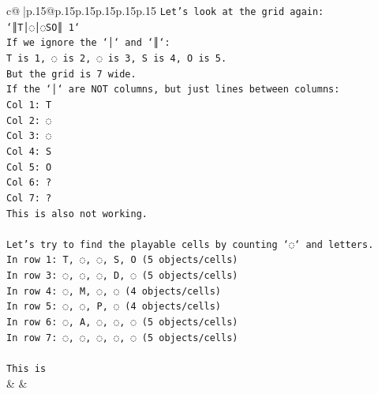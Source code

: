 \documentclass{article}
\begin{document}
{\begin{supertabular}{c@{$\;$}|p{.15\linewidth}@{}p{.15\linewidth}p{.15\linewidth}p{.15\linewidth}p{.15\linewidth}p{.15\linewidth}}
{{{\texttt{Let's look at the grid again:} \\
\texttt{`║T│◌│◌SO║ 1`} \\
\texttt{If we ignore the `│` and `║`:} \\
\texttt{T is 1, ◌ is 2, ◌ is 3, S is 4, O is 5.} \\
\texttt{But the grid is 7 wide.} \\
\texttt{If the `│` are NOT columns, but just lines between columns:} \\
\texttt{Col 1: T} \\
\texttt{Col 2: ◌} \\
\texttt{Col 3: ◌} \\
\texttt{Col 4: S} \\
\texttt{Col 5: O} \\
\texttt{Col 6: ?} \\
\texttt{Col 7: ?} \\
\texttt{This is also not working.} \\
\\ 
\texttt{Let's try to find the playable cells by counting `◌` and letters.} \\
\texttt{In row 1: T, ◌, ◌, S, O (5 objects/cells)} \\
\texttt{In row 3: ◌, ◌, ◌, D, ◌ (5 objects/cells)} \\
\texttt{In row 4: ◌, M, ◌, ◌ (4 objects/cells)} \\
\texttt{In row 5: ◌, ◌, P, ◌ (4 objects/cells)} \\
\texttt{In row 6: ◌, A, ◌, ◌, ◌ (5 objects/cells)} \\
\texttt{In row 7: ◌, ◌, ◌, ◌, ◌ (5 objects/cells)} \\
\\ 
\texttt{This is} \\
            }
        }
    }
    & & \\ \\


\end{supertabular}}
\end{document}
